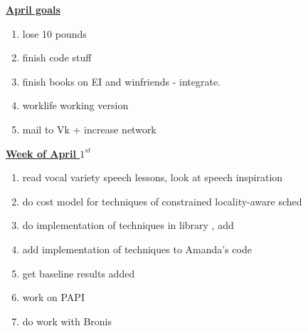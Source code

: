 
\underline{\textbf{April goals}} \\
\begin{enumerate}
\item lose 10 pounds 
\item finish code stuff 
\item finish books on EI and winfriends - integrate. 
\item worklife working version
\item mail to Vk  + increase network 
\end{enumerate}

\underline{\textbf{Week of April $1^{st}$}} \\

\begin{enumerate}

\item read vocal variety speech lessons, look at speech inspiration

\item do cost model for techniques of constrained locality-aware sched
\item do implementation of techniques in library , add
\item add implementation of techniques to Amanda's code
\item get baseline results added
\item work on PAPI
\item do work with Bronis

\end{enumerate}

